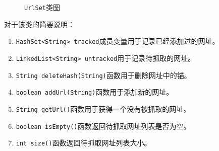 \documentclass[UTF8,a4paper,12pt]{ctexart}
\begin{document}
\begin{figure}[htbp]
\centering
{}
\caption{\texttt{UrlSet}类图}
\label{fig:urlset}
\end{figure}
对于该类的简要说明：
\begin{enumerate}[label=(\arabic*), wide=2em]
\item \texttt{HashSet<String> tracked}成员变量用于记录已经添加过的网址。
\item \texttt{LinkedList<String> untracked}用于记录待抓取的网址。
\item \texttt{String deleteHash(String)}函数用于删除网址中的锚。
\item \texttt{boolean addUrl(String)}函数用于添加新的网址。
\item \texttt{String getUrl()}函数用于获得一个没有被抓取的网址。
\item \texttt{boolean isEmpty()}函数返回待抓取网址列表是否为空。
\item \texttt{int size()}函数返回待抓取网址列表大小。
\end{enumerate}
\end{document}
